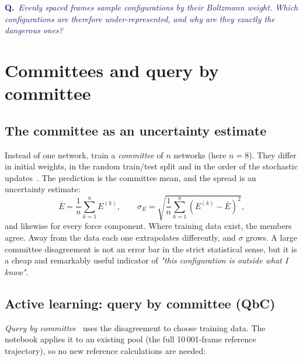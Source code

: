 \documentclass[11pt,a4paper]{article}
\newcommand{\question}[1]{\par\smallskip\noindent\textcolor{MidnightBlue}{\textbf{Q.}~\emph{#1}}\par\smallskip}
\begin{document}
\question{Evenly spaced frames sample configurations by their Boltzmann
weight. Which configurations are therefore under-represented, and why are they
exactly the dangerous ones?}

\section{Committees and query by committee}

\subsection{The committee as an uncertainty estimate}
Instead of one network, train a \emph{committee} of $n$ networks
(here $n=8$). They differ in initial weights, in the random train/test split
and in the order of the stochastic updates~\cite{Schran2020}. The prediction
is the committee mean, and the spread is an uncertainty estimate:
\begin{equation}
  \bar E = \frac1n\sum_{k=1}^n E^{(k)},\qquad
  \sigma_E = \sqrt{\frac1{n}\sum_{k=1}^n \left(E^{(k)}-\bar E\right)^2},
\end{equation}
and likewise for every force component. Where training data exist, the members
agree. Away from the data each one extrapolates differently, and
$\sigma$ grows. A large committee disagreement is not an error bar in the
strict statistical sense, but it is a cheap and remarkably useful indicator of
\emph{"this configuration is outside what I know"}.

\subsection{Active learning: query by committee (QbC)}
\emph{Query by committee}~\cite{Seung1992} uses the disagreement to choose
training data. The notebook applies it to an existing pool (the full
10\,001-frame reference trajectory), so no new reference calculations are
needed:
\end{document}
